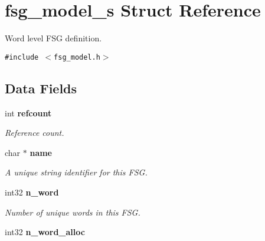 \section{fsg\_\-model\_\-s Struct Reference}
\label{structfsg__model__s}
Word level FSG definition.  


{\tt \#include $<$fsg\_\-model.h$>$}

\subsection*{Data Fields}
\begin{CompactItemize}
\item 
int {\bf refcount}
\begin{CompactList}\small\item\em Reference count. \item\end{CompactList}\item 
char $\ast$ {\bf name}\label{structfsg__model__s_b23ae2c362f1a3b18bbe135b97dfb467}

\begin{CompactList}\small\item\em A unique string identifier for this FSG. \item\end{CompactList}\item 
int32 {\bf n\_\-word}\label{structfsg__model__s_99ed2894f7690a960d11e1590d11a6b9}

\begin{CompactList}\small\item\em Number of unique words in this FSG. \item\end{CompactList}\item 
int32 {\bf n\_\-word\_\-alloc}\label{structfsg__model__s_329ae88c26111df8cd64657b46b9108f}


\end{CompactItemize}
